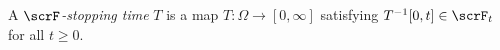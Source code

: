\begin{definition}
  A \emph{$\scrF$-stopping time} $T$ is a map $T: \Omega \rightarrow [0,\infty]$ satisfying $T^{-1}[0,t] \in \scrF_t$ for all $t \geq 0$.
\end{definition}
